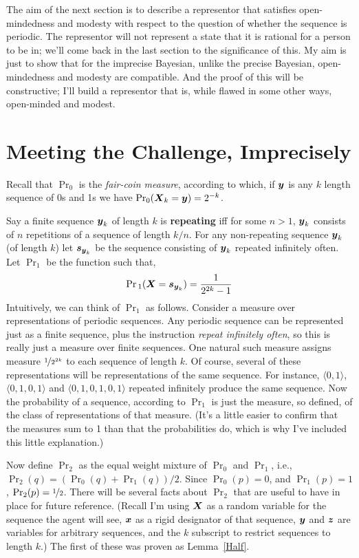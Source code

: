 The aim of the next section is to describe a representor that satisfies open-mind\-ed\-ness and modesty with respect to the question of whether the sequence is periodic. The representor will not represent a state that it is rational for a person to be in; we'll come back in the last section to the significance of this. My aim is just to show that for the imprecise Bayesian, unlike the precise Bayesian, open-mindedness and modesty are compatible. And the proof of this will be constructive; I'll build a representor that is, while flawed in some other ways, open-minded and modest.

\section{Meeting the Challenge, Imprecisely}

Recall that $\Pr_0$ is the \textit{fair-coin measure}, according to which, if $\boldsymbol{y}$ is  any $k$ length sequence of 0s and 1s we have $\Pr_0(\boldsymbol{X}_k = \boldsymbol{y}) = 2^{-k}$. 

Say a finite sequence $\boldsymbol{y}_k$ of length $k$ is \textbf{repeating} iff for some $n > 1$, $\boldsymbol{y}_k$ consists of $n$ repetitions of a sequence of length $k/n$. For any non-repeating sequence $\boldsymbol{y}_k$ (of length $k$) let $\boldsymbol{s}_{\boldsymbol{y}_k}$ be the sequence consisting of $\boldsymbol{y}_k$ repeated infinitely often. Let $\Pr_1$ be the function such that,
%
\[
\Pr{}_1(\boldsymbol{X} = \boldsymbol{s}_{\boldsymbol{y}_k}) = \frac{1}{2^{2k}-1}
\]
%
Intuitively, we can think of $\Pr_1$ as follows. Consider a measure over representations of periodic sequences. Any periodic sequence can be represented just as a finite sequence, plus the instruction \textit{repeat infinitely often}, so this is really just a measure over finite sequences. One natural such measure assigns measure $\nicefrac{1}{2^{2k}}$ to each sequence of length $k$. Of course, several of these representations will be representations of the same sequence. For instance, $\langle 0, 1 \rangle$, $\langle 0, 1, 0, 1 \rangle$ and $\langle 0, 1, 0, 1, 0, 1 \rangle$ repeated infinitely produce the same sequence. Now the probability of a sequence, according to $\Pr_1$ is just the measure, so defined, of the class of representations of that measure. (It's a little easier to confirm that the measures sum to 1 than that the probabilities do, which is why I've included this little explanation.)

Now define $\Pr_2$ as the equal weight mixture of $\Pr_0$ and $\Pr_1$, i.e., $\Pr_2(q) = (\Pr_0(q) + \Pr_1(q))/2$. Since $\Pr_0(p) = 0$, and $\Pr_1(p) = 1$, $\Pr_2(p) = \nicefrac{1}{2}$. There will be several facts about $\Pr_2$ that are useful to have in place for future reference. (Recall I'm using $\boldsymbol{X}$ as a random variable for the sequence the agent will see, $\boldsymbol{x}$ as a rigid designator of that sequence,  $\boldsymbol{y}$ and $\boldsymbol{z}$ are variables for arbitrary sequences, and the $k$ subscript to restrict sequences to length $k$.) The first of these was proven as Lemma~\ref{Half}.

